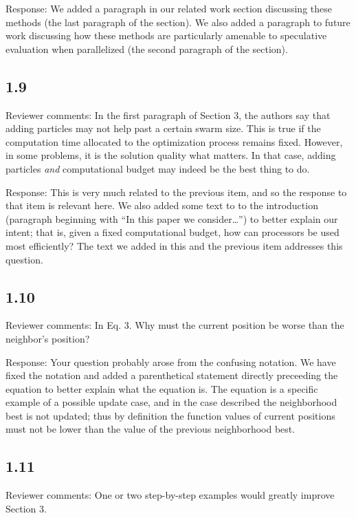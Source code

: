 \documentclass[onecolumn, 12pt]{article}
\begin{document}
Response: We added a paragraph in our related work section discussing these
methods (the last paragraph of the section).  We also added a paragraph to
future work discussing how these methods are particularly amenable to
speculative evaluation when parallelized (the second paragraph of the section).

\subsection*{1.9}

Reviewer comments: In the first paragraph of Section 3, the authors say that
adding particles may not help past a certain swarm size. This is true if the
computation time allocated to the optimization process remains fixed. However,
in some problems, it is the solution quality what matters. In that case, adding
particles \emph{and} computational budget may indeed be the best thing to do.

Response: This is very much related to the previous item, and so the response
to that item is relevant here.  We also added some text to to the introduction
(paragraph beginning with ``In this paper we consider\ldots'') to better
explain our intent; that is, given a fixed computational budget, how can
processors be used most efficiently?  The text we added in this and the
previous item addresses this question.

\subsection*{1.10}

Reviewer comments: In Eq. 3. Why must the current position be worse than the
neighbor's position?

Response: Your question probably arose from the confusing notation.  We have
fixed the notation and added a parenthetical statement directly preceeding the
equation to better explain what the equation is.  The equation is a specific
example of a possible update case, and in the case described the neighborhood
best is not updated; thus by definition the function values of current
positions must not be lower than the value of the previous neighborhood best.

\subsection*{1.11}

Reviewer comments: One or two step-by-step examples would greatly improve
Section 3.
\end{document}
